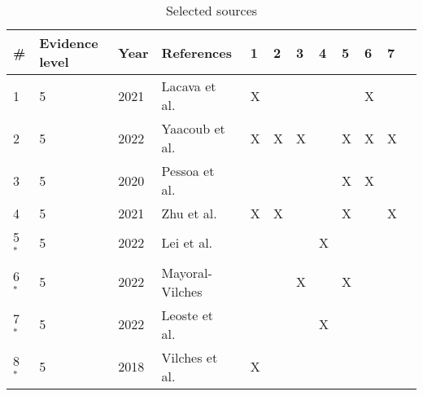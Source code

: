 \begin{table}[h]
  \centering
  \small
  \caption{Selected sources}
  \label{table:selected_sources}
  \begin{tabularx}{\textwidth}{|l|l|X|l|l|l|l|l|l|l|l|l|}
    \hline
    \textbf{\#} & \textbf{Evidence level} & \textbf{Year} & \textbf{References}                                              & \textbf{1} & \textbf{2} & \textbf{3} & \textbf{4} & \textbf{5}& \textbf{6}& \textbf{7}  \\\hline
    1           & 5                       & 2021          & Lacava et al.~\cite[]{cyber_security_issues_in_robotics_2021}    & X          &            &            &            &            & X          &            \\\hline
    2           & 5                       & 2022          & Yaacoub et al.~\cite[]{robotics_cyber_security_2022}             & X          & X          & X          &            & X          & X          & X          \\\hline
    3           & 5                       & 2020          & Pessoa et al.~\cite[]{smart_design_engineering_2020}             &            &            &            &            & X          & X          &            \\\hline
    4           & 5                       & 2021          & Zhu et al.~\cite[]{introduction_to_robot_system_security_2021}   & X          & X          &            &            & X          &           & X         \\\hline
    5 $^{\ast}$ & 5                       & 2022          & Lei et al.~\cite[]{acceptance-telepresence-robots-2022}          &            &            &            & X          &            &            &            \\\hline
    6 $^{\ast}$ & 5                       & 2022          & Mayoral-Vilches~\cite[]{robot_security_review_2022}              &            &            & X          &            & X          &            &            \\\hline
    7 $^{\ast}$ & 5                       & 2022          & Leoste et al.~\cite[]{higher_edu_perception_on_tprs_2022}        &            &            &            & X         &            &            &               \\\hline
    8 $^{\ast}$ & 5                       & 2018          & Vilches et al.~\cite[]{robot_security_framework_2018}            & X          &            &            &            &            &            &            \\\hline

\end{tabularx}
\end{table}
